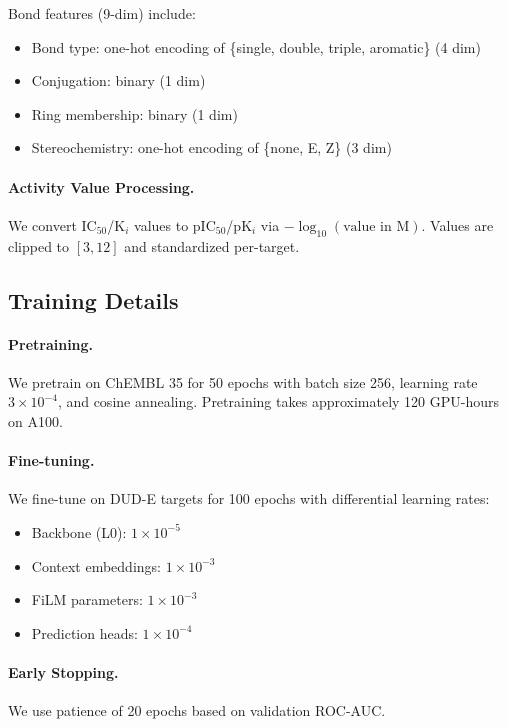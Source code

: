 \documentclass[sigconf]{acmart}
\begin{document}
Bond features (9-dim) include:
\begin{itemize}[noitemsep]
    \item Bond type: one-hot encoding of \{single, double, triple, aromatic\} (4 dim)
    \item Conjugation: binary (1 dim)
    \item Ring membership: binary (1 dim)
    \item Stereochemistry: one-hot encoding of \{none, E, Z\} (3 dim)
\end{itemize}

\paragraph{Activity Value Processing.} We convert IC$_{50}$/K$_i$ values to pIC$_{50}$/pK$_i$ via $-\log_{10}(\text{value in M})$. Values are clipped to $[3, 12]$ and standardized per-target.

\subsection{Training Details}

\paragraph{Pretraining.} We pretrain on ChEMBL 35 for 50 epochs with batch size 256, learning rate $3 \times 10^{-4}$, and cosine annealing. Pretraining takes approximately 120 GPU-hours on A100.

\paragraph{Fine-tuning.} We fine-tune on DUD-E targets for 100 epochs with differential learning rates:
\begin{itemize}[noitemsep]
    \item Backbone (L0): $1 \times 10^{-5}$
    \item Context embeddings: $1 \times 10^{-3}$
    \item FiLM parameters: $1 \times 10^{-3}$
    \item Prediction heads: $1 \times 10^{-4}$
\end{itemize}

\paragraph{Early Stopping.} We use patience of 20 epochs based on validation ROC-AUC.
\end{document}
